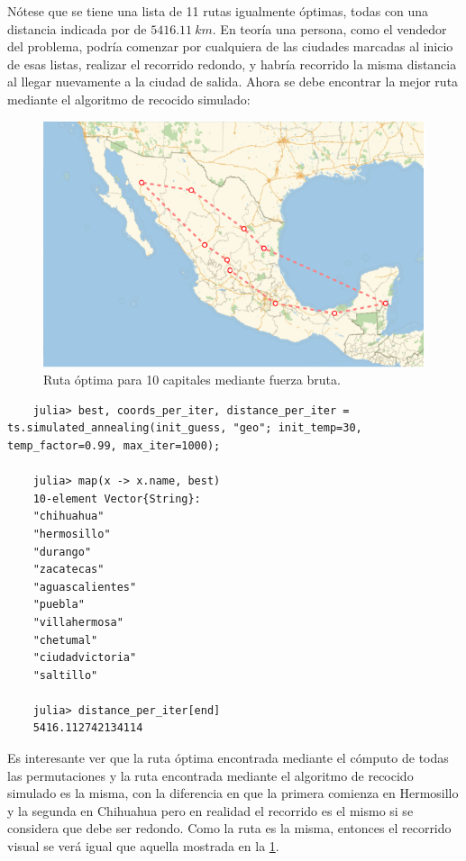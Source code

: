 Nótese que se tiene una lista de 11 rutas igualmente óptimas, todas con una distancia indicada por  de $5416.11\ km$. En teoría una persona, como el vendedor del problema, podría comenzar por cualquiera de las ciudades marcadas al inicio de esas listas, realizar el recorrido redondo, y habría recorrido la misma distancia al llegar nuevamente a la ciudad de salida. Ahora se debe encontrar la mejor ruta mediante el algoritmo de recocido simulado:

\begin{figure}[ht!]
    \centering
    \includegraphics[scale=0.8]{../figures/trip_cities_10_bruteforce.pdf}
    \caption{Ruta óptima para 10 capitales mediante fuerza bruta.}
    \label{fig:bruteforce_path_cities_10}
\end{figure}

\begin{verbatim}
    julia> best, coords_per_iter, distance_per_iter = ts.simulated_annealing(init_guess, "geo"; init_temp=30, temp_factor=0.99, max_iter=1000);

    julia> map(x -> x.name, best)
    10-element Vector{String}:
    "chihuahua"
    "hermosillo"
    "durango"
    "zacatecas"
    "aguascalientes"
    "puebla"
    "villahermosa"
    "chetumal"
    "ciudadvictoria"
    "saltillo"

    julia> distance_per_iter[end]
    5416.112742134114
\end{verbatim}

Es interesante ver que la ruta óptima encontrada mediante el cómputo de todas las permutaciones y la ruta encontrada mediante el algoritmo de recocido simulado es la misma, con la diferencia en que la primera comienza en Hermosillo y la segunda en Chihuahua pero en realidad el recorrido es el mismo si se considera que debe ser redondo. Como la ruta es la misma, entonces el recorrido visual se verá igual que aquella mostrada en la \cref{fig:bruteforce_path_cities_10}.

